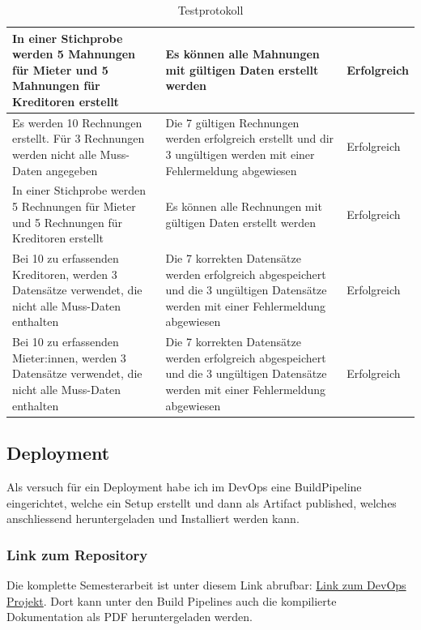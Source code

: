 \begin{table}[H]
\begin{tabulary}{1.0\textwidth}{|L|L|m{2cm}|}
    \hline
    In einer Stichprobe werden 5 Mahnungen für Mieter und 5 Mahnungen für Kreditoren erstellt & Es können alle Mahnungen mit gültigen Daten erstellt werden & Erfolgreich\\
    \hline
    Es werden 10 Rechnungen erstellt. Für 3 Rechnungen werden nicht alle Muss-Daten angegeben & Die 7 gültigen Rechnungen werden erfolgreich erstellt und dir 3 ungültigen werden mit einer Fehlermeldung abgewiesen &  Erfolgreich\\
    \hline   
    In einer Stichprobe werden 5 Rechnungen für Mieter und 5 Rechnungen für Kreditoren erstellt & Es können alle Rechnungen mit gültigen Daten erstellt werden &  Erfolgreich\\
    \hline
    Bei 10 zu erfassenden Kreditoren, werden 3 Datensätze verwendet, die nicht alle Muss-Daten enthalten & Die 7 korrekten Datensätze werden erfolgreich abgespeichert und die 3 ungültigen Datensätze werden mit einer Fehlermeldung abgewiesen &  Erfolgreich\\
    \hline
    Bei 10 zu erfassenden Mieter:innen, werden 3 Datensätze verwendet, die nicht alle Muss-Daten enthalten & Die 7 korrekten Datensätze werden erfolgreich abgespeichert und die 3 ungültigen Datensätze werden mit einer Fehlermeldung abgewiesen &  Erfolgreich\\
    \hline
  \end{tabulary}
  \caption{Testprotokoll}
\end{table}

\subsection{Deployment}
Als versuch für ein Deployment habe ich im DevOps eine BuildPipeline eingerichtet, welche ein Setup erstellt und dann als Artifact published, welches anschliessend heruntergeladen und Installiert werden kann. 

\subsubsection{Link zum Repository}
Die komplette Semesterarbeit ist unter diesem Link abrufbar: \href{https://dev.azure.com/michaelneuhaus/Semesterarbeit/}{Link zum DevOps Projekt}. Dort kann unter den Build Pipelines auch die kompilierte Dokumentation als PDF heruntergeladen werden.